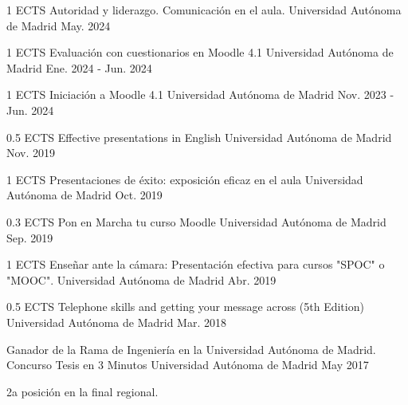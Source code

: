 \begin{cventries}
	  \cventry
    {1 ECTS} %
    {Autoridad y liderazgo. Comunicación en el aula.} %
    {Universidad Autónoma de Madrid} %
    {May. 2024} %
    {}

  \cventry
    {1 ECTS} %
    {Evaluación con cuestionarios en Moodle 4.1} %
    {Universidad Autónoma de Madrid} %
    {Ene. 2024 - Jun. 2024} %
    {}

  \cventry
    {1 ECTS} %
    {Iniciación a Moodle 4.1} %
    {Universidad Autónoma de Madrid} %
    {Nov. 2023 - Jun. 2024} %
    {}

  \cventry
    {0.5 ECTS} %
    {Effective presentations in English} %
    {Universidad Autónoma de Madrid} %
    {Nov. 2019} %
    {}

  \cventry
    {1 ECTS} %
    {Presentaciones de éxito: exposición eficaz en el aula} %
    {Universidad Autónoma de Madrid} %
    {Oct. 2019} %
    {}

  \cventry
    {0.3 ECTS} %
    {Pon en Marcha tu curso Moodle} %
    {Universidad Autónoma de Madrid} %
    {Sep. 2019} %
    {}

  \cventry
    {1 ECTS} %
    {Enseñar ante la cámara: Presentación efectiva para cursos "SPOC" o
"MOOC".} %
    {Universidad Autónoma de Madrid} %
    {Abr. 2019} %
    {}
    
  \cventry
    {0.5 ECTS} %
    {Telephone skills and getting your message across (5th Edition)} %
    {Universidad Autónoma de Madrid} %
    {Mar. 2018} %
    {}

\end{cventries}

\begin{cventries}
  \cventry
    {Ganador de la Rama de Ingeniería en la Universidad Autónoma de Madrid.} %
    {Concurso Tesis en 3 Minutos} %
    {Universidad Autónoma de Madrid} %
    {May 2017} %
    {
      \begin{cvitems} %
        \item {2a posición en la final regional.}
      \end{cvitems}
    }
\end{cventries}